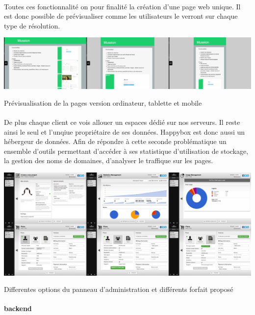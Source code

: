 \documentclass[11pt, a4paper ]{article}
\begin{document}
\paragraph{}

Toutes ces fonctionnalité on pour finalité la création d'une page web unique. Il est donc possible de prévisualiser comme les utilisateurs le verront sur chaque type de résolution.
\begin{center}
	\includegraphics[width=\textwidth]{images/HBscreen/preview.png}
	\caption{Prévisualisation de la pages version ordinateur, tablette et mobile}
\end{center}

\paragraph{}
De plus chaque client ce vois allouer un espaces dédié sur nos serveurs. Il reste ainsi le seul et l'unqiue propriétaire de ses données. Happybox est donc aussi un hébergeur de données. Afin de répondre à cette seconde problématique un ensemble d'outils permettant d'accéder à ses statistique d'utilisation de stockage, la gestion des noms de domaines, d'analyser le traffique sur les pages.

\begin{center}
	\includegraphics[width=\textwidth]{images/HBscreen/dash.png}
	\caption{Differentes options du panneau d'administration et différents forfait proposé}
\end{center}

\paragraph{backend}
\end{document}
